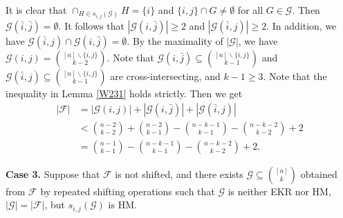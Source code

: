 \documentclass[11pt]{article}
\numberwithin{equation}{section}
\begin{document}
It is clear that $\cap_{H\in s_{i, j}(\mathcal{G})}H=\{i\}$ and $\{i,j\}\cap G\neq \emptyset$ for all $G\in \mathcal{G}$. Then $\mathcal{G}(\bar{i},\bar{j})= \emptyset$. It follows that $|\mathcal{G}(i,\bar{j})|\geq 2$ and $|\mathcal{G}(\bar{i},j)|\geq 2$. In addition, we have  $\mathcal{G}(\bar{i},j)\cap \mathcal{G}(i,\bar{j})=\emptyset$.
By the maximality of $|\mathcal{G}|$, we have
$\mathcal{G}(i,j)=\binom{[n]\backslash \{i,j\}}{k-2}$.  Note that $\mathcal{G}(i,\bar{j})\subseteq\binom{[n]\backslash \{i,j\}}{k-1}$ and $\mathcal{G}(\bar{i},j)\subseteq\binom{[n]\backslash \{i,j\}}{k-1}$ are cross-intersecting, and $k-1\geq 3$. Note that the inequality in Lemma \ref{W231} holds strictly.
Then we get
\begin{equation*}
\begin{aligned}
|\mathcal{F}|&=|\mathcal{G}(i,j)|+|\mathcal{G}(i,\bar{j})|+|\mathcal{G}(\bar{i}, j)| \\ 
& < \binom{n-2}{k-2}+\binom{n-2}{k-1}-\binom{n-k-1}{k-1}-\binom{n-k-2}{k-2}+2\\
&= \binom{n-1}{k-1}-\binom{n-k-1}{k-1}-\binom{n-k-2}{k-2}+2.
\end{aligned}
\end{equation*}

{\bf Case 3.}
Suppose that $\mathcal{F}$ is not shifted, and there exists $\mathcal{G} \subseteq\binom{[n]}{k}$ obtained from $\mathcal{F}$ by repeated shifting operations such that $\mathcal{G}$  is neither EKR nor HM, $|\mathcal{G}|=|\mathcal{F}|$, but $s_{i, j}(\mathcal{G})$ is HM.
\end{document}
